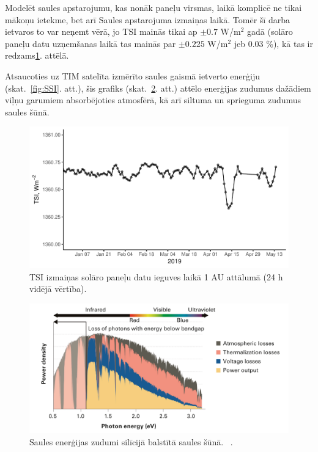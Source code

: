 Modelēt saules apstarojumu, kas nonāk paneļu virsmas, laikā komplicē ne tikai mākoņu ietekme, bet arī Saules apstarojuma izmaiņas laikā. Tomēr šī darba ietvaros to var neņemt vērā, jo TSI mainās tikai ap $\pm 0.7$ W/m$^2$ gadā (solāro paneļu datu uzņemšanas laikā tas mainās par $\pm 0.225$ W/m$^2$ jeb 0.03 \%), kā tas ir redzams\ref{fig:TSI2}. attēlā.

Atsaucoties uz TIM satelīta izmērīto saules gaismā ietverto enerģiju (skat.~\ref{fig:SSI}. att.), šis grafiks (skat.~\ref{fig:zudumi}. att.) attēlo enerģijas zudumus dažādiem viļņu garumiem absorbējoties atmosfērā, kā arī siltuma un sprieguma zudumus saules šūnā.

\begin{figure}[h]
    \centering
    \includegraphics[width=\linewidth]{figures/misc/TSI.pdf}
    \caption{TSI izmaiņas solāro paneļu datu ieguves laikā 1 AU attālumā (24 h vidējā vērtība)\cite{TSIdata}.}
    \label{fig:TSI2}
\end{figure}


\begin{figure}[h]
    \centering
    \includegraphics[width=\linewidth]{figures/misc/energyLosses.png}
    \caption{Saules enerģijas zudumi silīcijā balstītā saules šūnā.  ~\cite{Sivaram}.}
    \label{fig:zudumi}
\end{figure}

